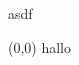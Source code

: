 \documentclass[a4paper]{scrartcl}
\begin{document}
	asdf
	\begin{textblock}{0.2}(0,0)
		hallo
	\end{textblock}
%	
%	
\end{document}
